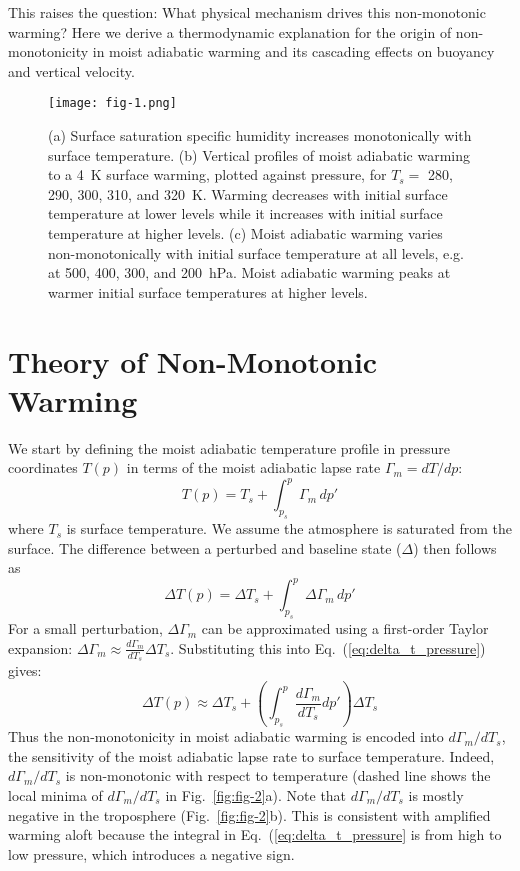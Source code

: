 \documentclass[draft]{ametsocV6.1}
\begin{document}
This raises the question: What physical mechanism drives this non-monotonic warming? Here we derive a thermodynamic explanation for the origin of non-monotonicity in moist adiabatic warming and its cascading effects on buoyancy and vertical velocity.

\begin{figure}[htbp]
 \centering
 \texttt{[image: fig-1.png]}\\
\caption{(a) Surface saturation specific humidity increases monotonically with surface temperature. (b) Vertical profiles of moist adiabatic warming to a 4~K surface warming, plotted against pressure, for $T_s = $ 280, 290, 300, 310, and 320~K. Warming decreases with initial surface temperature at lower levels while it increases with initial surface temperature at higher levels. (c) Moist adiabatic warming varies non-monotonically with initial surface temperature at all levels, e.g. at 500, 400, 300, and 200~hPa. Moist adiabatic warming peaks at warmer initial surface temperatures at higher levels.}
\label{fig:fig-1}
\end{figure}

\section{Theory of Non-Monotonic Warming}
We start by defining the moist adiabatic temperature profile in pressure coordinates $T(p)$ in terms of the moist adiabatic lapse rate $\Gamma_m = dT/dp$:
\begin{equation}
T(p) = T_s + \int_{p_s}^{p} \Gamma_m \, dp' \label{eq:temp_profile_pressure}
\end{equation}
where $T_s$ is surface temperature. We assume the atmosphere is saturated from the surface. The difference between a perturbed and baseline state ($\Delta$) then follows as
\begin{equation}
\Delta T(p) = \Delta T_s + \int_{p_s}^{p} \Delta\Gamma_m \, dp' \label{eq:delta_t_pressure}
\end{equation}
For a small perturbation, $\Delta \Gamma_m$ can be approximated using a first-order Taylor expansion: $\Delta\Gamma_m \approx \frac{d\Gamma_m}{dT_s}\Delta T_s$. Substituting this into Eq.~(\ref{eq:delta_t_pressure}) gives:
\begin{equation}
\Delta T(p) \approx \Delta T_s + \left(\int_{p_s}^{p} \frac{d\Gamma_m}{dT_s}dp'\right)\Delta T_s \label{eq:delta_t_taylor_pressure}
\end{equation}
Thus the non-monotonicity in moist adiabatic warming is encoded into $d\Gamma_m/dT_s$, the sensitivity of the moist adiabatic lapse rate to surface temperature. Indeed, $d\Gamma_m/dT_s$ is non-monotonic with respect to temperature (dashed line shows the local minima of $d\Gamma_m/dT_s$ in Fig.~\ref{fig:fig-2}a). Note that $d\Gamma_m/dT_s$ is mostly negative in the troposphere (Fig.~\ref{fig:fig-2}b). This is consistent with amplified warming aloft because the integral in Eq.~(\ref{eq:delta_t_pressure} is from high to low pressure, which introduces a negative sign.
\end{document}

